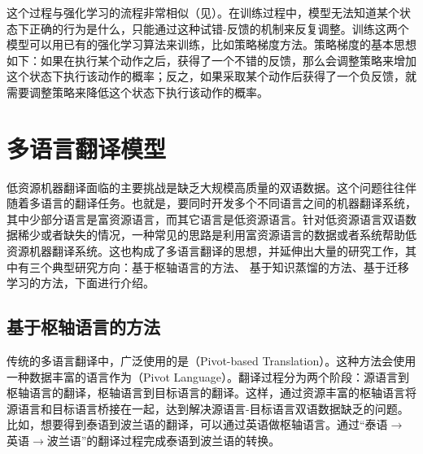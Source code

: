 \parinterval 这个过程与强化学习的流程非常相似（见{\chapterthirteen}）。在训练过程中，模型无法知道某个状态下正确的行为是什么，只能通过这种试错-反馈的机制来反复调整。训练这两个模型可以用已有的强化学习算法来训练，比如策略梯度方法。策略梯度的基本思想如下：如果在执行某个动作之后，获得了一个不错的反馈，那么会调整策略来增加这个状态下执行该动作的概率；反之，如果采取某个动作后获得了一个负反馈，就需要调整策略来降低这个状态下执行该动作的概率。

\sectionnewpage
\section{多语言翻译模型}\label{multilingual-translation-model}

\parinterval 低资源机器翻译面临的主要挑战是缺乏大规模高质量的双语数据。这个问题往往伴随着多语言的翻译任务。也就是，要同时开发多个不同语言之间的机器翻译系统，其中少部分语言是富资源语言，而其它语言是低资源语言。针对低资源语言双语数据稀少或者缺失的情况，一种常见的思路是利用富资源语言的数据或者系统帮助低资源机器翻译系统。这也构成了多语言翻译的思想，并延伸出大量的研究工作，其中有三个典型研究方向：基于枢轴语言的方法、 基于知识蒸馏的方法、基于迁移学习的方法，下面进行介绍。


\subsection{基于枢轴语言的方法}
\label{sec:pivot-based-translation}

\parinterval 传统的多语言翻译中，广泛使用的是{\small{}}（Pivot-based Translation）。这种方法会使用一种数据丰富的语言作为{\small{}}（Pivot Language）。翻译过程分为两个阶段：源语言到枢轴语言的翻译，枢轴语言到目标语言的翻译。这样，通过资源丰富的枢轴语言将源语言和目标语言桥接在一起，达到解决源语言-目标语言双语数据缺乏的问题。比如，想要得到泰语到波兰语的翻译，可以通过英语做枢轴语言。通过“泰语$\to$英语$\to$波兰语”的翻译过程完成泰语到波兰语的转换。

